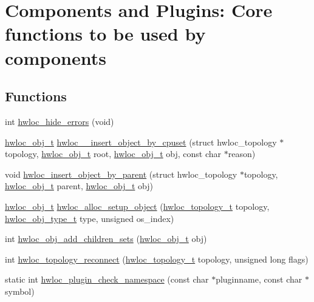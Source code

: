 \hypertarget{a00230}{}\section{Components and Plugins\+: Core functions to be used by components}
\label{a00230}
\subsection*{Functions}
\begin{DoxyCompactItemize}
\item 
int \hyperlink{a00230_gab527c1e0f243f057d31a724794ad9f88}{hwloc\+\_\+hide\+\_\+errors} (void)
\item 
\hyperlink{a00185_ga79b8ab56877ef99ac59b833203391c7d}{hwloc\+\_\+obj\+\_\+t} \hyperlink{a00230_ga1e105cfe3c8e77f34cc6df3841deebbc}{hwloc\+\_\+\+\_\+insert\+\_\+object\+\_\+by\+\_\+cpuset} (struct hwloc\+\_\+topology $\ast$topology, \hyperlink{a00185_ga79b8ab56877ef99ac59b833203391c7d}{hwloc\+\_\+obj\+\_\+t} root, \hyperlink{a00185_ga79b8ab56877ef99ac59b833203391c7d}{hwloc\+\_\+obj\+\_\+t} obj, const char $\ast$reason)
\item 
void \hyperlink{a00230_ga0ef97debde503b56367689b07bb3e901}{hwloc\+\_\+insert\+\_\+object\+\_\+by\+\_\+parent} (struct hwloc\+\_\+topology $\ast$topology, \hyperlink{a00185_ga79b8ab56877ef99ac59b833203391c7d}{hwloc\+\_\+obj\+\_\+t} parent, \hyperlink{a00185_ga79b8ab56877ef99ac59b833203391c7d}{hwloc\+\_\+obj\+\_\+t} obj)
\item 
\hyperlink{a00185_ga79b8ab56877ef99ac59b833203391c7d}{hwloc\+\_\+obj\+\_\+t} \hyperlink{a00230_ga0b5c75b2dc37cea2e8a29c4812baf4b3}{hwloc\+\_\+alloc\+\_\+setup\+\_\+object} (\hyperlink{a00186_ga9d1e76ee15a7dee158b786c30b6a6e38}{hwloc\+\_\+topology\+\_\+t} topology, \hyperlink{a00184_gacd37bb612667dc437d66bfb175a8dc55}{hwloc\+\_\+obj\+\_\+type\+\_\+t} type, unsigned os\+\_\+index)
\item 
int \hyperlink{a00230_ga754b61041ceee9685534a2c5d3cd0156}{hwloc\+\_\+obj\+\_\+add\+\_\+children\+\_\+sets} (\hyperlink{a00185_ga79b8ab56877ef99ac59b833203391c7d}{hwloc\+\_\+obj\+\_\+t} obj)
\item 
int \hyperlink{a00230_ga120d8bd74922e1030b621409a6b0be61}{hwloc\+\_\+topology\+\_\+reconnect} (\hyperlink{a00186_ga9d1e76ee15a7dee158b786c30b6a6e38}{hwloc\+\_\+topology\+\_\+t} topology, unsigned long flags)
\item 
static int \hyperlink{a00230_gac2eaed287bb215cf0bd33014e9e1d374}{hwloc\+\_\+plugin\+\_\+check\+\_\+namespace} (const char $\ast$pluginname, const char $\ast$symbol)
\end{DoxyCompactItemize}


